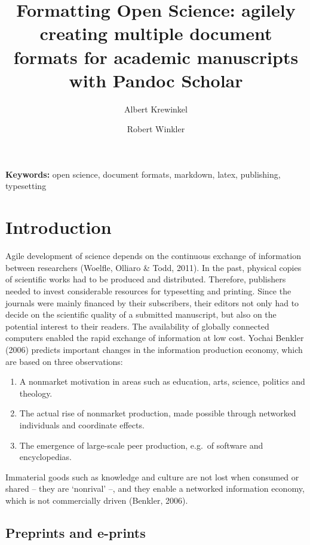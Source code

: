 \documentclass[10pt,fleqn]{wlpeerj}
\title{Formatting Open Science: agilely creating multiple document formats for
academic manuscripts with Pandoc Scholar}
\author[1]{Albert Krewinkel}
\author[2,✉]{Robert Winkler}
\affil[1]{Pandoc Development Team}
\affil[2]{CINVESTAV Unidad Irapuato, Department of Biochemistry and Biotechnology}
\date{}
\providecommand{\tightlist}{%
  \setlength{\itemsep}{0pt}\setlength{\parskip}{0pt}}
\begin{document}
\flushbottom
\maketitle
\thispagestyle{empty}

\textbf{Keywords:} open science, document formats, markdown, latex,
publishing, typesetting

 

 

\newpage

\section{Introduction}\label{introduction}

Agile development of science depends on the continuous exchange of
information between researchers (Woelfle, Olliaro \& Todd, 2011). In the
past, physical copies of scientific works had to be produced and
distributed. Therefore, publishers needed to invest considerable
resources for typesetting and printing. Since the journals were mainly
financed by their subscribers, their editors not only had to decide on
the scientific quality of a submitted manuscript, but also on the
potential interest to their readers. The availability of globally
connected computers enabled the rapid exchange of information at low
cost. Yochai Benkler (2006) predicts important changes in the
information production economy, which are based on three observations:

\begin{enumerate}
\def\labelenumi{\arabic{enumi}.}
\tightlist
\item
  A nonmarket motivation in areas such as education, arts, science,
  politics and theology.
\item
  The actual rise of nonmarket production, made possible through
  networked individuals and coordinate effects.
\item
  The emergence of large-scale peer production, e.g.~of software and
  encyclopedias.
\end{enumerate}

Immaterial goods such as knowledge and culture are not lost when
consumed or shared -- they are `nonrival' --, and they enable a
networked information economy, which is not commercially driven
(Benkler, 2006).

\subsection{Preprints and e-prints}\label{preprints-and-e-prints}
\end{document}
